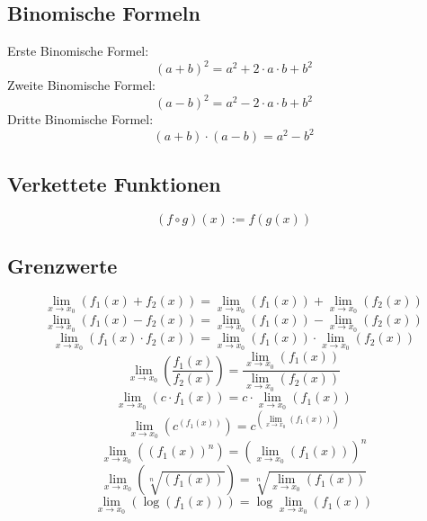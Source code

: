 \subsection{Binomische Formeln}
Erste Binomische Formel: 
\[ \boxed{(a + b)^2 = a^2 + 2 \cdot a \cdot b + b^2} \]Zweite Binomische Formel: 
\[ \boxed{(a - b)^2 = a^2 - 2 \cdot a \cdot b + b^2} \]Dritte Binomische Formel: 
\[ \boxed{(a + b) \cdot (a - b) = a^2 - b^2} \]

\subsection{Verkettete Funktionen}
\[ \boxed{(f \circ g)(x) := f(g(x))} \]

\subsection{Grenzwerte}
\[ \boxed{\lim\limits_{x \to x_0}(f_1(x) + f_2(x)) = \lim\limits_{x \to x_0}(f_1(x)) + \lim\limits_{x \to x_0}(f_2(x))} \]
\[ \boxed{\lim\limits_{x \to x_0}(f_1(x) - f_2(x)) = \lim\limits_{x \to x_0}(f_1(x)) - \lim\limits_{x \to x_0}(f_2(x))} \]
\[ \boxed{\lim\limits_{x \to x_0}(f_1(x) \cdot f_2(x)) = \lim\limits_{x \to x_0}(f_1(x)) \cdot \lim\limits_{x \to x_0}(f_2(x))} \]
\[ \boxed{\lim\limits_{x \to x_0}\left(\frac{f_1(x)}{f_2(x)}\right) = \frac{\lim\limits_{x \to x_0}(f_1(x))}{\lim\limits_{x \to x_0}(f_2(x))}} \]
\[ \boxed{\lim\limits_{x \to x_0}(c \cdot f_1(x)) = c \cdot \lim\limits_{x \to x_0}(f_1(x))} \]
\[ \boxed{\lim\limits_{x \to x_0}\left(c^{(f_1(x))}\right) = c^{\left(\lim\limits_{x \to x_0}(f_1(x))\right)}} \]
\[ \boxed{\lim\limits_{x \to x_0}\left((f_1(x))^n\right) = \left(\lim\limits_{x \to x_0}(f_1(x))\right)^n} \]
\[ \boxed{\lim\limits_{x \to x_0}\left(\sqrt[n]{(f_1(x))}\right) = \sqrt[n]{\lim\limits_{x \to x_0}(f_1(x))}} \]
\[ \boxed{\lim\limits_{x \to x_0}\left(\log{(f_1(x))}\right) = \log{\lim\limits_{x \to x_0}(f_1(x))}} \]

